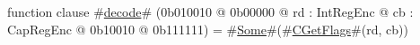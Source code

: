function clause #\hyperref[sailMIPSzdecode]{decode}# (0b010010 @ 0b00000 @ rd : IntRegEnc @ cb : CapRegEnc @   0b10010 @ 0b111111) = #\hyperref[sailMIPSzSome]{Some}#(#\hyperref[sailMIPSzCGetFlags]{CGetFlags}#(rd, cb))

